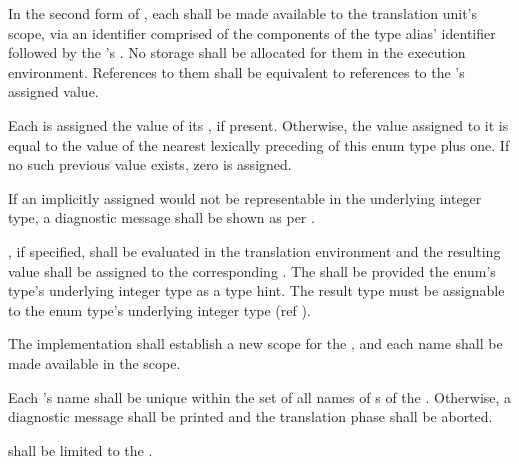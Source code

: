 \specsubsubitem
In the second form of , each 
shall be made available to the translation unit's scope, via an identifier
comprised of the components of the type alias' identifier followed by the
's . No storage shall be allocated for
them in the execution environment. References to them shall be equivalent to
references to the 's assigned value.

\specsubsubitem
Each  is assigned the value of its
, if present. Otherwise, the value assigned to it is
equal to the value of the nearest lexically preceding 
of this enum type plus one. If no such previous value exists, zero is assigned.

\specsubsubitem
If an implicitly assigned  would not be representable in
the underlying integer type, a diagnostic message shall be shown as per
.

\specsubsubitem
{}, if specified, shall be evaluated in the translation
environment and the resulting value shall be assigned to the corresponding
. The  shall be provided the
enum's type's underlying integer type as a type hint. The result type must be
assignable to the enum type's underlying integer type (ref
).

\specsubsubitem
The implementation shall establish a new scope for the
, and each  name shall be made
available in the scope.


\specsubsubitem
Each 's name shall be unique within the set of all
names of s of the . Otherwise, a
diagnostic message shall be printed and the translation phase shall be aborted.

\specsubsubitem
{} shall be limited to the
.


